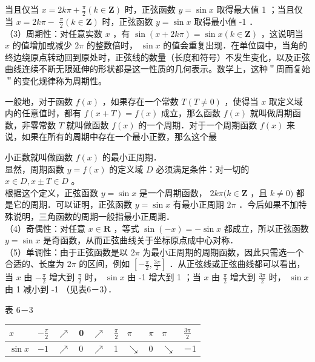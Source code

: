 \documentclass[10pt]{article}
\begin{document}
当且仅当 \(x=2 k \pi+\frac{\pi}{2}(k \in \mathbf{Z})\) 时，正弦函数 \(y=\sin x\) 取得最大值 1 ；当且仅当 \(x=2 k \pi-\) \(\frac{\pi}{2}(k \in \mathbf{Z})\) 时，正弦函数 \(y=\sin x\) 取得最小值 -1 ．\\
（3）周期性：对任意实数 \(x\) ，有 \(\sin (x+2 k \pi)=\sin x(k \in \mathbf{Z})\) ，这说明当 \(x\) 的值增加或减少 \(2 \pi\) 的整数倍时， \(\sin x\) 的值会重复出现．在单位圆中，当角的终边绕原点转动回到原处时，正弦线的数量（长度和符号）不发生变化，以及正弦曲线连续不断无限延伸的形状都是这一性质的几何表示。数学上，这种＂周而复始＂的变化规律称为周期性。

一般地，对于函数 \(f(x)\) ，如果存在一个常数 \(T(T \neq 0)\) ，使得当 \(x\) 取定义域内的任意值时，都有 \(f(x+T)=f(x)\) 成立，那么函数 \(f(x)\) 就叫做周期函数，非零常数 \(T\) 就叫做函数 \(f(x)\) 的一个周期．对于一个周期函数 \(f(x)\) 来说，如果在所有的周期中存在一个最小正数，那么这个最

小正数就叫做函数 \(f(x)\) 的最小正周期．\\
显然，周期函数 \(y=f(x)\) 的定义域 \(D\) 必须满足条件：对一切的 \(x \in D, x \pm T \in D\) 。\\
根据这个定义，正弦函数 \(y=\sin x\) 是一个周期函数， \(2 k \pi(k \in \mathbf{Z}\) ，且 \(k \neq 0)\) 都是它的周期．可以证明，正弦函数 \(y=\sin x\) 有最小正周期 \(2 \pi\) ．今后如果不加特殊说明，三角函数的周期一般指最小正周期．\\
（4）奇偶性：对任意 \(x \in \mathbf{R}\) ，等式 \(\sin (-x)=-\sin x\) 都成立，所以正弦函数 \(y=\sin x\) 是奇函数，从而正弦曲线关于坐标原点成中心对称．\\
（5）单调性：由于正弦函数是以 \(2 \pi\) 为最小正周期的周期函数，因此只需选一个合适的、长度为 \(2 \pi\) 的区间，例如 \(\left[-\frac{\pi}{2}, \frac{3 \pi}{2}\right]\) ．从正弦线或正弦曲线都可以看出，当 \(x\) 由 \(-\frac{\pi}{2}\) 增大到 \(\frac{\pi}{2}\) 时， \(\sin x\) 由 -1 增大到 1 ；当 \(x\) 由 \(\frac{\pi}{2}\) 增大到 \(\frac{3 \pi}{2}\) 时， \(\sin x\) 由 1 减小到 -1 （见表6－3）．

表 6－3

\begin{center}
\begin{tabular}{|l|l|l|l|l|l|l|l|l|l|}
\hline
\(x\) & \(-\frac{\pi}{2}\) & \(\nearrow\) & 0 & \(\nearrow\) & \(\frac{\pi}{2}\) & \(\pi\) & \(\pi\) & \(\pi\) & \(\frac{3 \pi}{2}\) \\
\hline
\(\sin x\) & \(-1\) & \(\nearrow\) & 0 & \(\nearrow\) & 1 & \(\searrow\) & 0 & \(\searrow\) & －1 \\
\hline
\end{tabular}
\end{center}
\end{document}
